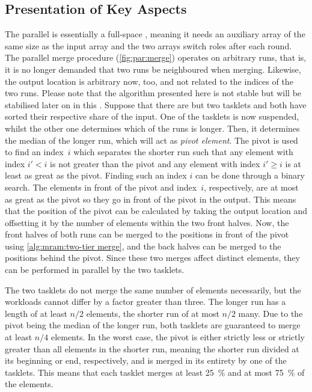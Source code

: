 \subsection{Presentation of Key Aspects}
\label{sec:mram:par:aspects}

The parallel \MS{} is essentially a full-space \MS{}, meaning it needs an auxiliary array of the same size as the input array and the two arrays switch roles after each round.
The parallel merge procedure (\cref{fig:par:merge}) operates on arbitrary runs, that is, it is no longer demanded that two runs be neighboured when merging.
Likewise, the output location is arbitrary now, too, and not related to the indices of the two runs.
Please note that the algorithm presented here is not stable but will be stabilised later on in this .
Suppose that there are but two tasklets and both have sorted their respective share of the input.
One of the tasklets is now suspended, whilst the other one determines which of the runs is longer.
Then, it determines the median of the longer run, which will act as \emph{pivot element}.
The pivot is used to find an index~\(i\) which separates the shorter run such that any element with index \(i' < i\) is not greater than the pivot and any element with index \(i' \ge i\) is at least as great as the pivot.
Finding such an index \(i\) can be done through a binary search.
The elements in front of the pivot and index~\(i\), respectively, are at most as great as the pivot so they go in front of the pivot in the output.
This means that the position of the pivot can be calculated by taking the output location and offsetting it by the number of elements within the two front halves.
Now, the front halves of both runs can be merged to the positions in front of the pivot using \cref{alg:mram:two-tier merge}, and the back halves can be merged to the positions behind the pivot.
Since these two merges affect distinct elements, they can be performed in parallel by the two tasklets.

The two tasklets do not merge the same number of elements necessarily, but the workloads cannot differ by a factor greater than three.
The longer run has a length of at least \(n/2\) elements, the shorter run of at most \(n/2\) many.
Due to the pivot being the median of the longer run, both tasklets are guaranteed to merge at least \(n/4\) elements.
In the worst case, the pivot is either strictly less or strictly greater than all elements in the shorter run, meaning the shorter run divided at its beginning or end, respectively, and is merged in its entirety by one of the tasklets.
This means that each tasklet merges at least \qty{25}{\percent} and at most \qty{75}{\percent} of the elements.

